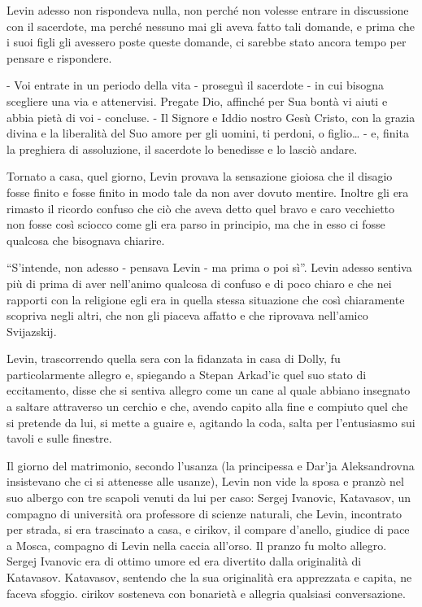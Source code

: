 Levin adesso non rispondeva nulla, non perché non volesse entrare in discussione con il sacerdote, ma perché nessuno mai gli aveva fatto tali domande, e prima che i suoi figli gli avessero poste queste domande, ci sarebbe stato ancora tempo per pensare e rispondere. 

- Voi entrate in un periodo della vita - proseguì il sacerdote - in cui bisogna scegliere una via e attenervisi. Pregate Dio, affinché per Sua bontà vi aiuti e abbia pietà di voi - concluse. - Il Signore e Iddio nostro Gesù Cristo, con la grazia divina e la liberalità del Suo amore per gli uomini, ti perdoni, o figlio\ldots{} - e, finita la preghiera di assoluzione, il sacerdote lo benedisse e lo lasciò andare. 

Tornato a casa, quel giorno, Levin provava la sensazione gioiosa che il disagio fosse finito e fosse finito in modo tale da non aver dovuto mentire. Inoltre gli era rimasto il ricordo confuso che ciò che aveva detto quel bravo e caro vecchietto non fosse così sciocco come gli era parso in principio, ma che in esso ci fosse qualcosa che bisognava chiarire. 
\enlargethispage*{1\baselineskip}

``S'intende, non adesso - pensava Levin - ma prima o poi sì''. Levin adesso sentiva più di prima di aver nell'animo qualcosa di confuso e di poco chiaro e che nei rapporti con la religione egli era in quella stessa situazione che così chiaramente scopriva negli altri, che non gli piaceva affatto e che riprovava nell'amico Svijazskij. 

Levin, trascorrendo quella sera con la fidanzata in casa di Dolly, fu particolarmente allegro e, spiegando a Stepan Arkad'ic quel suo stato di eccitamento, disse che si sentiva allegro come un cane al quale abbiano insegnato a saltare attraverso un cerchio e che, avendo capito alla fine e compiuto quel che si pretende da lui, si mette a guaire e, agitando la coda, salta per l'entusiasmo sui tavoli e sulle finestre. 

\label{ii-4} 

Il giorno del matrimonio, secondo l'usanza (la principessa e Dar'ja Aleksandrovna insistevano che ci si attenesse alle usanze), Levin non vide la sposa e pranzò nel suo albergo con tre scapoli venuti da lui per caso: Sergej Ivanovic, Katavasov, un compagno di università ora professore di scienze naturali, che Levin, incontrato per strada, si era trascinato a casa, e cirikov, il compare d'anello, giudice di pace a Mosca, compagno di Levin nella caccia all'orso. Il pranzo fu molto allegro. Sergej Ivanovic era di ottimo umore ed era divertito dalla originalità di Katavasov. Katavasov, sentendo che la sua originalità era apprezzata e capita, ne faceva sfoggio. cirikov sosteneva con bonarietà e allegria qualsiasi conversazione. 

